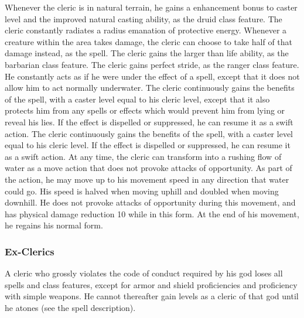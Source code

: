  Whenever the cleric is in natural terrain, he gains a  enhancement bonus to caster level and the improved natural casting ability, as the druid class feature.
 The cleric constantly radiates a \areamed radius emanation of protective energy. Whenever a creature within the area takes damage, the cleric can choose to take half of that damage instead, as the  spell.
 The cleric gains the larger than life ability, as the barbarian class feature.
 The cleric gains perfect stride, as the ranger class feature. He constantly acts as if he were under the effect of a  spell, except that it does not allow him to act normally underwater.
 The cleric continuously gains the benefits of the  spell, with a caster level equal to his cleric level, except that it also protects him from any spells or effects which would prevent him from lying or reveal his lies. If the effect is dispelled or suppressed, he can resume it as a swift action.
 The cleric continuously gains the benefits of the  spell, with a caster level equal to his cleric level. If the effect is dispelled or suppressed, he can resume it as a swift action.
 At any time, the cleric can transform into a rushing flow of water as a move action that does not provoke attacks of opportunity. As part of the action, he may move up to his movement speed in any direction that water could go. His speed is halved when moving uphill and doubled when moving downhill. He does not provoke attacks of opportunity during this movement, and has physical damage reduction 10 while in this form. At the end of his movement, he regains his normal form.

\subsubsection{Ex-Clerics}
A cleric who grossly violates the code of conduct required by his god loses all spells and class features, except for armor and shield proficiencies and proficiency with simple weapons. He cannot thereafter gain levels as a cleric of that god until he atones (see the  spell description).

